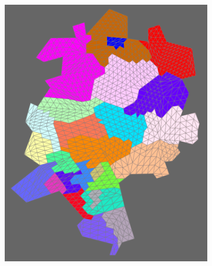 
\begin{figure}
	\begin{center}
		\begin{subfigure}[b]{0.4\textwidth}
			\includegraphics[width=\textwidth]{./figures/grid.png}
		\end{subfigure}
		\begin{subfigure}[b]{0.4\textwidth}

\end{subfigure}
\end{center}
\end{figure}
